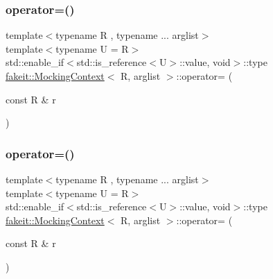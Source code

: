 \subsubsection{\texorpdfstring{operator=()}{operator=()}\hspace{0.1cm}{\footnotesize\ttfamily [20/27]}}
{\footnotesize\ttfamily template$<$typename R , typename ... arglist$>$ \\
template$<$typename U  = R$>$ \\
std\+::enable\+\_\+if$<$std\+::is\+\_\+reference$<$U$>$\+::value, void$>$\+::type \mbox{\hyperlink{classfakeit_1_1MockingContext}{fakeit\+::\+Mocking\+Context}}$<$ R, arglist $>$\+::operator= (\begin{DoxyParamCaption}\item[{const R \&}]{r }\end{DoxyParamCaption})\hspace{0.3cm}{\ttfamily [inline]}}

\mbox{\label{classfakeit_1_1MockingContext_ad5e903b223858dbe67f1da1523ef0d60}} 
\subsubsection{\texorpdfstring{operator=()}{operator=()}\hspace{0.1cm}{\footnotesize\ttfamily [21/27]}}
{\footnotesize\ttfamily template$<$typename R , typename ... arglist$>$ \\
template$<$typename U  = R$>$ \\
std\+::enable\+\_\+if$<$std\+::is\+\_\+reference$<$U$>$\+::value, void$>$\+::type \mbox{\hyperlink{classfakeit_1_1MockingContext}{fakeit\+::\+Mocking\+Context}}$<$ R, arglist $>$\+::operator= (\begin{DoxyParamCaption}\item[{const R \&}]{r }\end{DoxyParamCaption})\hspace{0.3cm}{\ttfamily [inline]}}

\mbox{\label{classfakeit_1_1MockingContext_aadefb2bd6c1dee1f3aa8902277dd3fc2}} 
